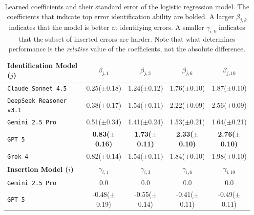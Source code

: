 \documentclass{article}
\newcommand{\gemini}{\texttt{Gemini 2.5 Pro}}
\newcommand{\gpt}{\texttt{GPT 5}}
\newcommand{\grok}{\texttt{Grok 4}}
\newcommand{\deepseek}{\texttt{DeepSeek Reasoner v3.1}}
\newcommand{\claude}{\texttt{Claude Sonnet 4.5}}
\begin{document}
\begin{table}[t]
    \centering
    \begin{tabular}{lcccc}
        \hline
        \textbf{Identification Model ($j$)} & $\beta_{j,1}$ & $\beta_{j,3}$ & $\beta_{j,6}$ & $\beta_{j,10}$\\
        \hline
        \claude{} & 0.25($\pm$0.18) & 1.24($\pm$0.12) & 1.76($\pm$0.10) & 1.87($\pm$0.10)\\
        \deepseek{} & 0.38($\pm$0.17) & 1.54($\pm$0.11) & 2.22($\pm$0.09) & 2.56($\pm$0.09)\\
        \gemini{} & 0.51($\pm$0.34) & 1.41($\pm$0.24) & 1.53($\pm$0.21) & 1.64($\pm$0.21)\\
        \gpt{} & \textbf{0.83($\pm$0.16)} & \textbf{1.73($\pm$0.11)} & \textbf{2.33($\pm$0.10)} & \textbf{2.76($\pm$0.10)}\\
        \grok{} & 0.82($\pm$0.14) & 1.54($\pm$0.11) & 1.84($\pm$0.10) & 1.98($\pm$0.10)\\
        \hline
        \textbf{Insertion Model ($i$)} & $\gamma_{i,1}$ & $\gamma_{i,3}$ & $\gamma_{i,6}$ & $\gamma_{i,10}$\\
        \hline
        \gemini{} & 0.0 & 0.0 & 0.0 & 0.0\\
        \gpt{} & -0.48($\pm$0.19) & -0.55($\pm$0.14) & -0.41($\pm$0.11) & -0.49($\pm$0.11)\\
        \hline
    \end{tabular}
    \caption{Learned coefficients and their standard error of the logistic regression model. The coefficients that indicate top error identification ability are bolded. A larger $\beta_{j,k}$ indicates that the model is better at identifying errors. A smaller $\gamma_{i, k}$ indicates that the subset of inserted errors are harder. Note that what determines performance is the \emph{relative} value of the coefficients, not the absolute difference.}
    \label{table:logistic_coefficients}
\end{table}
\end{document}
